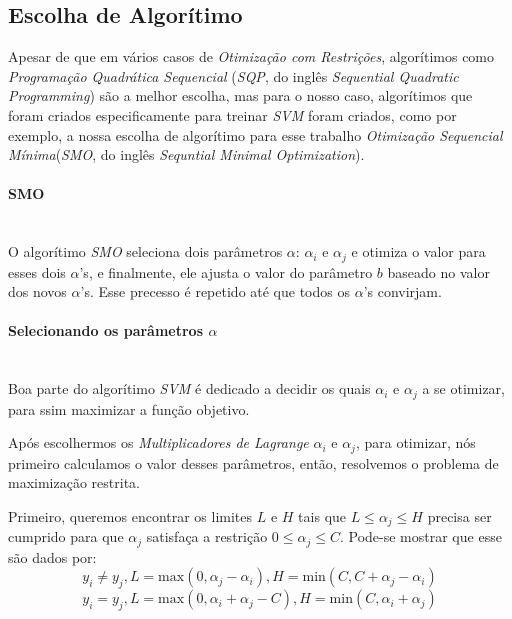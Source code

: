 \documentclass{article}
\begin{document}
\subsection{Escolha de Algorítimo}

Apesar de que em vários casos de \textit{Otimização com Restrições}, algorítimos como \textit{Programação Quadrática Sequencial} (\textit{SQP}, do inglês \textit{Sequential Quadratic Programming})\cite{Ademir} são a melhor escolha, mas para o nosso caso, algorítimos que foram criados especificamente para treinar \textit{SVM} foram criados, como por exemplo, a nossa escolha de algorítimo para esse trabalho \textit{Otimização Sequencial Mínima}(\textit{SMO}, do inglês \textit{Sequntial Minimal Optimization})\cite{platt}.

\paragraph{SMO} \hspace{0pt}\\

O algorítimo \textit{SMO} seleciona dois parâmetros \(\alpha\): \(\alpha_i\) e \(\alpha_j\) e otimiza o valor para esses dois \(\alpha\)'s, e finalmente, ele ajusta o valor do parâmetro \(b\) baseado no valor dos novos \(\alpha\)'s. Esse precesso é repetido até que todos os \(\alpha\)'s convirjam.

\paragraph{Selecionando os parâmetros \(\alpha\)} \hspace{0pt}\\

Boa parte do algorítimo \textit{SVM} é dedicado a decidir os quais \(\alpha_i\) e \(\alpha_j\) a se otimizar, para ssim maximizar a função objetivo.

Após escolhermos os \textit{Multiplicadores de Lagrange} \(\alpha_i\) e \(\alpha_j\), para otimizar, nós primeiro calculamos o valor desses parâmetros, então, resolvemos o problema de maximização restrita.

Primeiro, queremos encontrar os limites \(L\) e \(H\) tais que \(L\leq\alpha_j\leq H\) precisa ser cumprido para que \(\alpha_j\) satisfaça a restrição \(0\leq\alpha_j\leq C\). 
Pode-se mostrar que esse são dados por:
\begin{equation}\label{case1}
    y_i\neq y_j, L = \text{max}(0,\alpha_j-\alpha_i), H=\text{min}(C,C+\alpha_j-\alpha_i)
\end{equation}
\begin{equation}\label{case2}
    y_i=y_j, L = \text{max}(0,\alpha_i+\alpha_j-C), H=\text{min}(C,\alpha_i+\alpha_j)
\end{equation}
\end{document}
